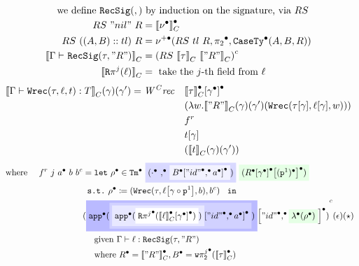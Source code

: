 

\begin{align*}
  \text{we define } \texttt{RecSig}({},{}) &\text{ by induction on the signature, via } RS \\
  RS~"nil"~R &= {\llbracket {\ensuremath{\nu^\bullet}} \rrbracket}_C^\bullet \\
  RS~((A, B) :: tl)~R &= \nu^{+\bullet}({RS~tl~R},{{\pi_2}^\bullet},{\texttt{CaseTy}^\bullet({A},{B},{R})}) \\ 
  {\llbracket {\ensuremath{ {\Gamma} \vdash_{} {\texttt{RecSig}({\tau},{"R"})} }} \rrbracket}_C &= {({RS~{\llbracket {\tau} \rrbracket}_C~{\llbracket {"R"} \rrbracket}_C})}^c \\
  {\llbracket {\ensuremath{\texttt{R}\pi^{j}({\ell})}} \rrbracket}_C &= \text{ take the $j$-th field from } \ell 
\end{align*}
\begin{align*}
  {\llbracket {\ensuremath{ {\Gamma} \vdash {\ensuremath{\texttt{Wrec}({\tau},{\ell},{t})}} : {T} }} \rrbracket}_C(\gamma)(\gamma') = \mathit{W^Crec} \quad &{{\llbracket {\ensuremath{\tau}} \rrbracket}_C^\bullet}\!\left[{{\gamma}^\bullet}\right]^\bullet \\ 
  & (\lambda w. {\llbracket {"R"} \rrbracket}_C(\gamma)(\gamma')(\texttt{Wrec}({{\tau}\!\left[{\gamma}\right]},{{\ell}\!\left[{\gamma}\right]},{w})))\\
  &f^r\\ &{t}\!\left[{\gamma}\right]\\ 
  &({\llbracket {t} \rrbracket}_C(\gamma)(\gamma')) 
\end{align*}
\begin{align*}  
  \text{ where } \quad f^r~j~\Glued{a}~b~b^c &= 
  \texttt{let}~\Glued{\rho}  \in \GTm{
    \colorbox{blue!15}{(\Glued{\cdot} \Glued{,} \colorbox{blue!5}{\Gsub{\Glued{B}}{\GSubstExt{\Glued{"id"}}{\Glued{a}}}})}
    }{
      \colorbox{green!10}{(\Gsub{\Gsub{\Glued{R}}{\Glued{\gm}}}{\GSubstWeak{1}})}
    } 
  \\
  &\texttt{ s.t.}~\Glued{\rho} \coloneq (\Wrec{\wsig}{\sub{\lkg}{\SubstComp{\gm}{\SubstWeak{1}}}}{b},b^c)~\texttt{ in } \\
  & \Gmodel{
    \Gsub{
      \colorbox{blue!27}{\Gapp{
        \colorbox{blue!18}{\Gsub{
          \colorbox{blue!9}{\Gapp{
            \colorbox{blue!0}{\GRecproj{j}{\Gsub{\denotesCC{\lkg}}{\Glued{\gm}}}}
            }}
          }{
            \GSubstExt{\GSubstId}{\Glued{a}}
          }}}}
      }{
        \GSubstExt{\GSubstId}{
          \colorbox{green!10}{\Glam{\Glued{\rho}}}
          }
      }
    }(\epsilon)(\star) \\
  & \quad 
   \text{ given } \goodTerm{\Gm}{\lkg}{\RecSig{\wsig}{"R"}} \\
   & \quad \text{ where }\Glued{R} = \denotesCC{"R"}, \Glued{B} = \Gwsigproj{j}{2}{\denotesCC{\wsig}}
\end{align*}

